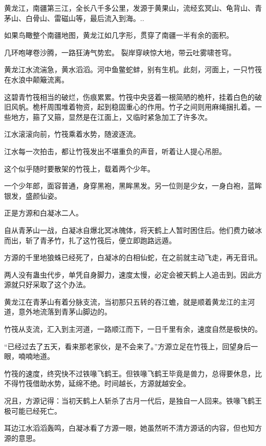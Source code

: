
\begin{this_body}

黄龙江，南疆第三江，全长八千多公里，发源于黄果山，流经玄冥山、龟背山、青茅山、白骨山、雷磁山等，最后流入到海。..

如果鸟瞰整个南疆地图，黄龙江如几字形，贯穿了南疆一半有余的面积。

几环咆哮卷沙腾，一路狂涛气势宏。 裂岸穿峡惊大地，带云吐雾啸苍穹。

黄龙江水流湍急，黄水滔滔。河中鱼鳖蛇蚌，别有生机。此刻，河面上，一只竹筏在水浪中颠簸流离。

这碧青竹筏相当的破烂，伤痕累累。竹筏中央竖着一根简陋的桅杆，挂着白色的破旧风帆。桅杆周围堆着物资，起到稳固重心的作用。竹子之间则用麻绳捆扎着。一些地方，箍了又箍，显然是在江面上，又临时紧急加工了许多次。

江水滚滚向前，竹筏乘着水势，随波逐流。

江水每一次拍击，都让竹筏发出不堪重负的声音，听着让人提心吊胆。

这个似乎随时要散架的竹筏上，载着两个少年。

一个少年郎，面容普通，身穿黑袍，黑眸黑发。另一位则是少女，一身白袍，蓝眸银发，盛颜仙姿。

正是方源和白凝冰二人。

自从青茅山一战，白凝冰自爆北冥冰魄体，将天鹤上人暂时困住后。他们费力破冰而出，斩了青矛竹，扎了这竹筏后，便立即跑路远遁。

方源的千里地狼蛛已经死了，白凝冰的白相仙蛇，在之前就主动飞走，再无音讯。

两人没有蛊虫代步，单凭自身脚力，速度太慢，必定会被天鹤上人追击到。因此方源就只好采取了这个办法。

黄龙江在青茅山有着分脉支流，当初那只五转的吞江蟾，就是顺着黄龙江的主河道，意外地流落到青茅山脚边的。

竹筏从支流，汇入到主河道，一路顺江而下，一日千里有余，速度自然是极快的。

“已经过去了五天，看来那老家伙，是不会来了。”方源立足在竹筏上，回望身后一眼，喃喃地道。

竹筏的速度，终究快不过铁喙飞鹤王。但铁喙飞鹤王毕竟是兽力，总得要休息，比不得竹筏借助水势，延绵不绝。时间越长，方源就越安全。

况且，方源记得：当初天鹤上人斩杀了古月一代后，是独自一人回来。铁喙飞鹤王极可能已经死亡。

耳边江水滔滔轰鸣，白凝冰看了方源一眼，她虽然听不清方源话的内容，但也知方源的意思。


\end{this_body}
